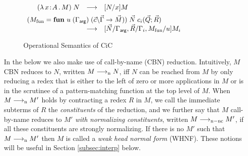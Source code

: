 \documentclass{article}
\begin{document}
\begin{figure}
\centering
\iftechreport\else\begin{small}\fi
\begin{math}
\begin{array}{@{}rcl@{}}

\hspace{20pt}(\lamabs{x}{A}{M})\;N & \rrto & [N/x]M
\\[5pt]

\multicolumn{3}{l}{
  (\Mfun=\pmfun{u}{\Gammaarg}{\pc{\vec{c}}{\vec{\Gamma}}{\vec{M}}})\;
           \vec{N}\;\ctorapp{c_i}{\vec{Q}}{\vec{R}}
} \\
& \rrto & 
  [\vec{N}/\Gammaarg,\vec{R}/\Gamma_i,\Mfun/u]M_i
\end{array}
\end{math}
\iftechreport\else\end{small}\fi
\caption{Operational Semantics of CiC}
\label{fig:opsem}
\end{figure}





\iftechreport\else
In the below we also make use of call-by-name (CBN) reduction.
Intuitively, $M$ CBN reduces to $N$, written $M\longrightarrow_{\mathrm{n}} N$, iff $N$
can be reached from $M$ by only reducing a redex that is either to the
left of zero or more applications in $M$ or is in the scrutinee of a
pattern-matching function at the top level of $M$.  When $M\longrightarrow_{\mathrm{n}}
M'$ holds by contracting a redex $R$ in $M$, we call the immediate
subterms of $R$ the \emph{constituents} of the reduction, and we
further say that $M$ call-by-name reduces to $M'$ \emph{with
  normalizing constituents}, written $M\longrightarrow_{\mathrm{n-nc}} M'$, if all these
constituents are strongly normalizing. If there is no $M'$ such that
$M\longrightarrow_{\mathrm{n}} M'$ then $M$ is called a \emph{weak head normal form}
(WHNF).  These notions will be useful in Section \ref{subsec:interp}
below.
\fi
\end{document}
